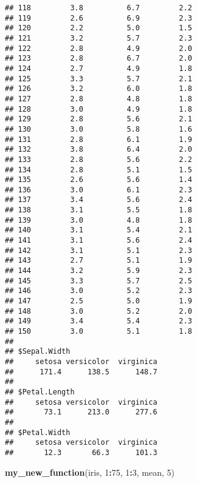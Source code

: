 \documentclass[
]{article}
\newenvironment{Shaded}{\begin{snugshade}}{\end{snugshade}}
\newcommand{\DecValTok}[1]{\textcolor[rgb]{0.00,0.00,0.81}{#1}}
\newcommand{\KeywordTok}[1]{\textcolor[rgb]{0.13,0.29,0.53}{\textbf{#1}}}
\newcommand{\NormalTok}[1]{#1}
\newcommand{\OperatorTok}[1]{\textcolor[rgb]{0.81,0.36,0.00}{\textbf{#1}}}
\begin{document}
\begin{verbatim}
## 118         3.8          6.7         2.2
## 119         2.6          6.9         2.3
## 120         2.2          5.0         1.5
## 121         3.2          5.7         2.3
## 122         2.8          4.9         2.0
## 123         2.8          6.7         2.0
## 124         2.7          4.9         1.8
## 125         3.3          5.7         2.1
## 126         3.2          6.0         1.8
## 127         2.8          4.8         1.8
## 128         3.0          4.9         1.8
## 129         2.8          5.6         2.1
## 130         3.0          5.8         1.6
## 131         2.8          6.1         1.9
## 132         3.8          6.4         2.0
## 133         2.8          5.6         2.2
## 134         2.8          5.1         1.5
## 135         2.6          5.6         1.4
## 136         3.0          6.1         2.3
## 137         3.4          5.6         2.4
## 138         3.1          5.5         1.8
## 139         3.0          4.8         1.8
## 140         3.1          5.4         2.1
## 141         3.1          5.6         2.4
## 142         3.1          5.1         2.3
## 143         2.7          5.1         1.9
## 144         3.2          5.9         2.3
## 145         3.3          5.7         2.5
## 146         3.0          5.2         2.3
## 147         2.5          5.0         1.9
## 148         3.0          5.2         2.0
## 149         3.4          5.4         2.3
## 150         3.0          5.1         1.8
## 
## $Sepal.Width
##     setosa versicolor  virginica 
##      171.4      138.5      148.7 
## 
## $Petal.Length
##     setosa versicolor  virginica 
##       73.1      213.0      277.6 
## 
## $Petal.Width
##     setosa versicolor  virginica 
##       12.3       66.3      101.3
\end{verbatim}

\begin{Shaded}
\begin{Highlighting}[]
\KeywordTok{my_new_function}\NormalTok{(iris, }\DecValTok{1}\OperatorTok{:}\DecValTok{75}\NormalTok{, }\DecValTok{1}\OperatorTok{:}\DecValTok{3}\NormalTok{, mean, }\DecValTok{5}\NormalTok{)}
\end{Highlighting}
\end{Shaded}
\end{document}
